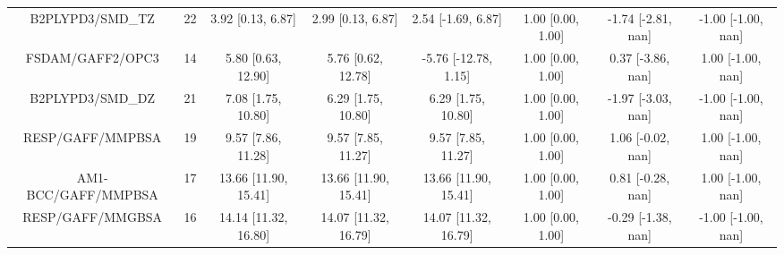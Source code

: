 \documentclass[8pt]{article}
\begin{document}
\begin{center}
\begin{footnotesize}
\begin{longtable}{|cccccccc|}
                   B2PLYPD3/SMD\_TZ &    22 &     3.92 [0.13, 6.87] &     2.99 [0.13, 6.87] &    2.54 [-1.69, 6.87] &  1.00 [0.00, 1.00] &  -1.74 [-2.81, nan] &  -1.00 [-1.00, nan] \\
                   FSDAM/GAFF2/OPC3 &    14 &    5.80 [0.63, 12.90] &    5.76 [0.62, 12.78] &  -5.76 [-12.78, 1.15] &  1.00 [0.00, 1.00] &   0.37 [-3.86, nan] &   1.00 [-1.00, nan] \\
                   B2PLYPD3/SMD\_DZ &    21 &    7.08 [1.75, 10.80] &    6.29 [1.75, 10.80] &    6.29 [1.75, 10.80] &  1.00 [0.00, 1.00] &  -1.97 [-3.03, nan] &  -1.00 [-1.00, nan] \\
                   RESP/GAFF/MMPBSA &    19 &    9.57 [7.86, 11.28] &    9.57 [7.85, 11.27] &    9.57 [7.85, 11.27] &  1.00 [0.00, 1.00] &   1.06 [-0.02, nan] &   1.00 [-1.00, nan] \\
                AM1-BCC/GAFF/MMPBSA &    17 &  13.66 [11.90, 15.41] &  13.66 [11.90, 15.41] &  13.66 [11.90, 15.41] &  1.00 [0.00, 1.00] &   0.81 [-0.28, nan] &   1.00 [-1.00, nan] \\
                   RESP/GAFF/MMGBSA &    16 &  14.14 [11.32, 16.80] &  14.07 [11.32, 16.79] &  14.07 [11.32, 16.79] &  1.00 [0.00, 1.00] &  -0.29 [-1.38, nan] &  -1.00 [-1.00, nan] \\
\end{longtable}
\end{footnotesize}
\end{center}
\end{document}
